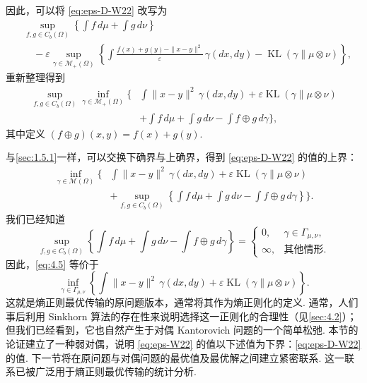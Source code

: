 因此，可以将 \eqref{eq:eps-D-W22} 改写为
$$\begin{aligned}
&\sup_{f,g\in C_b(\Omega)}\left\{\int f\,d\mu+\int g\,d\nu\right\}\\
&\quad-\varepsilon\sup_{\gamma\in\mathcal M_+(\Omega)}
\left\{\int\frac{f(x)+g(y)-\|x-y\|^2}{\varepsilon}\,\gamma(dx,dy)
-\operatorname{KL}(\gamma\|\mu\otimes\nu)\right\},
\end{aligned}$$
重新整理得到
$$\begin{aligned}
\sup_{f,g\in C_b(\Omega)}\inf_{\gamma\in\mathcal M_+(\Omega)}\biggl\{
&\int\|x-y\|^2\,\gamma(dx,dy)+\varepsilon\operatorname{KL}(\gamma\|\mu\otimes\nu)\\
&+\int f\,d\mu+\int g\,d\nu-\int f\oplus g\,d\gamma\biggr\},
\end{aligned}$$
其中定义 $(f\oplus g)(x,y)=f(x)+g(y)$.

与\autoref{sec:1.5.1}一样，可以交换下确界与上确界，得到 \eqref{eq:eps-D-W22} 的值的上界：
\begin{equation}\label{eq:4.5}
\begin{aligned}
\inf_{\gamma\in\mathcal M(\Omega)}\biggl\{
&\int\|x-y\|^2\,\gamma(dx,dy)+\varepsilon\operatorname{KL}(\gamma\|\mu\otimes\nu)\\
&+\sup_{f,g\in C_b(\Omega)}\left\{\int f\,d\mu+\int g\,d\nu-\int f\oplus g\,d\gamma\right\}\biggr\}.
\end{aligned}
\end{equation}
我们已经知道
$$\sup_{f,g\in C_b(\Omega)}\left\{\int f\,d\mu+\int g\,d\nu-\int f\oplus g\,d\gamma\right\}
=\begin{cases}0,&\gamma\in\Gamma_{\mu,\nu},\\\infty,&\text{其他情形.}\end{cases}$$
因此，\eqref{eq:4.5} 等价于
\begin{equation}\tag{$\varepsilon$-$W_2^2$}\label{eq:eps-W22}
\inf_{\gamma\in\Gamma_{\mu,\nu}}\left\{\int\|x-y\|^2\,\gamma(dx,dy)
+\varepsilon\operatorname{KL}(\gamma\|\mu\otimes\nu)\right\}.
\end{equation}
这就是熵正则最优传输的原问题版本，通常将其作为熵正则化的定义. 通常，人们事后利用 Sinkhorn 算法的存在性来说明选择这一正则化的合理性（见\autoref{sec:4.2}）；但我们已经看到，它也自然产生于对偶 Kantorovich 问题的一个简单松弛. 本节的论证建立了一种弱对偶，说明 \eqref{eq:eps-W22} 的值以下述值为下界：\eqref{eq:eps-D-W22} 的值. 下一节将在原问题与对偶问题的最优值及最优解之间建立紧密联系. 这一联系已被广泛用于熵正则最优传输的统计分析.
